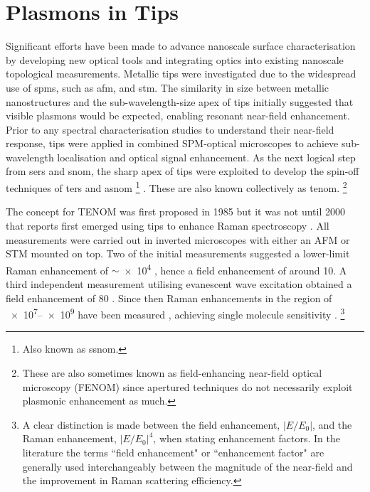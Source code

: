 \documentclass{article}
\begin{document}
\section{Plasmons in Tips}
\label{sec:tip_literature}

Significant efforts have been made to advance nanoscale surface characterisation by developing new optical tools and integrating optics into existing nanoscale topological measurements. Metallic tips were  investigated due to the widespread use of \glspl{spm}, such as \gls{afm}, and \gls{stm}. The similarity in size between metallic nanostructures and the sub-wavelength-size apex of tips initially suggested that visible plasmons would be expected, enabling resonant near-field enhancement. Prior to any spectral characterisation studies to understand their near-field response, tips were applied in combined SPM-optical microscopes to achieve sub-wavelength localisation and optical signal enhancement. As the next logical step from \gls{sers} and \gls{snom}, the sharp apex of tips were exploited to develop the spin-off techniques of \gls{ters} \cite{stockle2000, anderson2000, hayazawa2000, pettinger2000} and \gls{asnom}%
\footnote{Also known as \gls{ssnom}.}
\cite{zenhausern1994, zenhausern1995, bachelot1995, knoll1997, knoll1998, keilmann1999}.
These are also known collectively as \gls{tenom}.%
\footnote{These are also sometimes known as field-enhancing near-field optical microscopy (FENOM) since apertured techniques do not necessarily exploit plasmonic enhancement as much.}

The concept for TENOM was first proposed in 1985 \cite{wessel1985} but it was not until 2000 that reports first emerged using tips to enhance Raman spectroscopy \cite{stockle2000, anderson2000, hayazawa2000, pettinger2000}. All measurements were carried out in inverted microscopes with either an AFM \cite{stockle2000, anderson2000, hayazawa2000} or STM \cite{pettinger2000} mounted on top. Two of the initial measurements suggested a lower-limit Raman enhancement of $\sim$\num{e4} \cite{stockle2000, anderson2000}, hence a field enhancement of around 10. A third independent measurement utilising evanescent wave excitation obtained a field enhancement of 80 \cite{hayazawa2000}. Since then Raman enhancements in the region of \num{e7}--\num{e9} have been measured \cite{pettinger2012}, achieving single molecule sensitivity \cite{zhang2013}.%
\footnote{A clear distinction is made between the field enhancement, $|E/E_0|$, and the Raman enhancement, $|E/E_0|^4$, when stating enhancement factors. In the literature the terms ``field enhancement" or ``enhancement factor" are generally used interchangeably between the magnitude of the near-field and the improvement in Raman scattering efficiency.}
\end{document}
